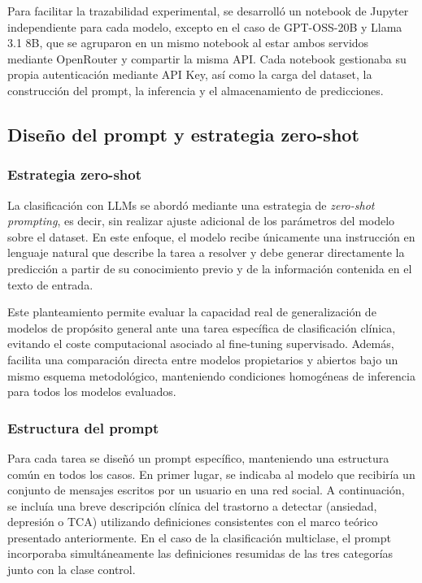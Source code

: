 Para facilitar la trazabilidad experimental, se desarrolló un notebook de Jupyter independiente para cada modelo, excepto en el caso de GPT-OSS-20B y Llama 3.1 8B, que se agruparon en un mismo notebook al estar ambos servidos mediante OpenRouter y compartir la misma API. Cada notebook gestionaba su propia autenticación mediante API Key, así como la carga del dataset, la construcción del prompt, la inferencia y el almacenamiento de predicciones.

\subsection{Diseño del prompt y estrategia zero-shot}

\subsubsection{Estrategia zero-shot}

La clasificación con \acp{LLM} se abordó mediante una estrategia de \textit{zero-shot prompting}, es decir, sin realizar ajuste adicional de los parámetros del modelo sobre el dataset. En este enfoque, el modelo recibe únicamente una instrucción en lenguaje natural que describe la tarea a resolver y debe generar directamente la predicción a partir de su conocimiento previo y de la información contenida en el texto de entrada.

Este planteamiento permite evaluar la capacidad real de generalización de modelos de propósito general ante una tarea específica de clasificación clínica, evitando el coste computacional asociado al fine-tuning supervisado. Además, facilita una comparación directa entre modelos propietarios y abiertos bajo un mismo esquema metodológico, manteniendo condiciones homogéneas de inferencia para todos los modelos evaluados.

\subsubsection{Estructura del prompt}

Para cada tarea se diseñó un prompt específico, manteniendo una estructura común en todos los casos. En primer lugar, se indicaba al modelo que recibiría un conjunto de mensajes escritos por un usuario en una red social. A continuación, se incluía una breve descripción clínica del trastorno a detectar (ansiedad, depresión o \ac{TCA}) utilizando definiciones consistentes con el marco teórico presentado anteriormente. En el caso de la clasificación multiclase, el prompt incorporaba simultáneamente las definiciones resumidas de las tres categorías junto con la clase control.


